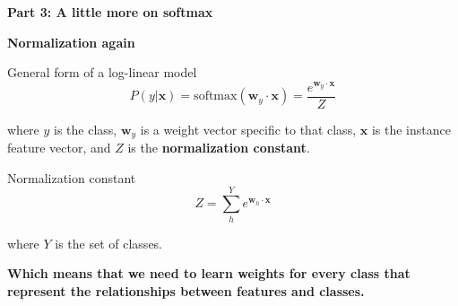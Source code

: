 \documentclass{beamer}
\newcommand{\placard}[1]{
  \begin{frame}
    \begin{center}
      \huge
      \textbf{#1}
    \end{center}
  \end{frame}
}
\newcommand{\pagestepalt}[2]{
  \begin{frame}[t]
    \begin{minipage}[t][0.26\textheight][t]{\textwidth}
      \begin{center}
        \huge
        \textbf{#1}
      \end{center}
    \end{minipage}
    
    \begin{minipage}[t][0.7\textheight][c]{\textwidth}
      #2
    \end{minipage}
  \end{frame}
}
\begin{document}
\placard{Part 3: A little more on softmax}

\pagestepalt{Normalization again}{
  \begin{block}{General form of a log-linear model}
      \[P(y|\mathbf{x}) = \text{softmax}(\mathbf{w}_y \cdot \mathbf{x}) = \frac{e^{\mathbf{w}_y \cdot \mathbf{x}}}{Z}\]
  \end{block}\pause
  where $y$ is the class, $\mathbf{w}_y$ is a weight vector
  \alert{specific to that class}, $\mathbf{x}$ is the instance feature
  vector, and $Z$ is the \textbf{normalization constant}.
  \begin{block}{Normalization constant}
    \[Z = \sum_h^Y e^{\mathbf{w}_h \cdot \mathbf{x}}\]
  \end{block}
  where $Y$ is the set of classes.\\
}

\placard{Which means that we need to learn weights \alert{for every class} that represent the relationships between features and classes.}
\end{document}
